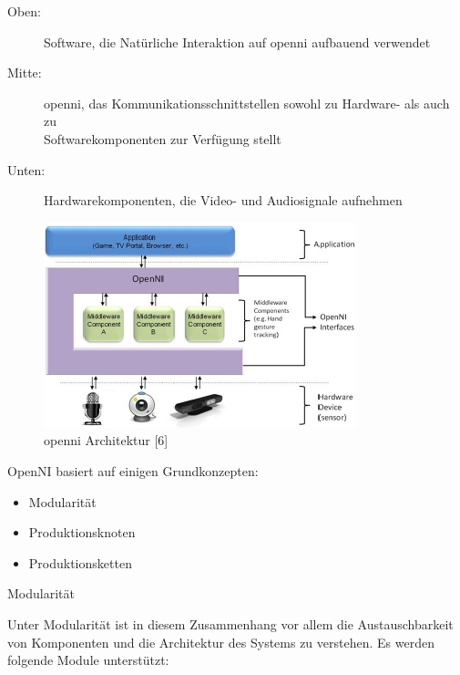 \begin{description}
  \item[Oben:] Software, die Natürliche Interaktion auf \gls{openni} aufbauend
  verwendet
  \item[Mitte:] \gls{openni}, das Kommunikationsschnittstellen sowohl zu
  Hardware- als auch zu\\ Softwarekomponenten zur Verfügung stellt
  \item[Unten:] Hardwarekomponenten, die Video- und Audiosignale aufnehmen
\end{description}

\begin{figure}[h]
\center
\includegraphics[scale=0.8]{graphics/openNI.jpg}
\caption{\label{fig:openNI} \gls{openni} Architektur [6]}
\end{figure}

OpenNI basiert auf einigen Grundkonzepten:

\begin{itemize}
  \item Modularität
  \item Produktionsknoten
  \item Produktionsketten
\end{itemize}

\begin{description}
\item[Modularität]
\end{description}

Unter Modularität ist in diesem Zusammenhang vor allem die Austauschbarkeit von Komponenten
 und die Architektur des Systems zu verstehen.
 Es werden folgende Module unterstützt:


